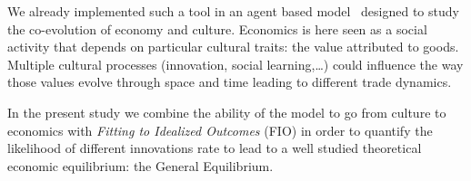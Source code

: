 \documentclass[a1paper,fontscale=.49]{baposter}
\begin{document}
\begin{poster}
{	We already implemented such a tool in an agent based model~\cite{carrignon2015modelingthecoevolutionoftradeandcultureinpastsocieties} designed to study the co-evolution of economy and culture. Economics is here seen as a social activity that depends on particular cultural traits: the value attributed to goods. Multiple cultural processes (innovation, social learning,\ldots) could influence the way those values evolve through space and time leading to different trade dynamics. 
	
	In the present study we combine the ability of the model to go from culture to economics with \emph{Fitting to Idealized Outcomes} (FIO) in order to quantify the likelihood of different innovations rate to lead to a well studied theoretical economic equilibrium: the General Equilibrium.



}

\end{poster}
\end{document}
